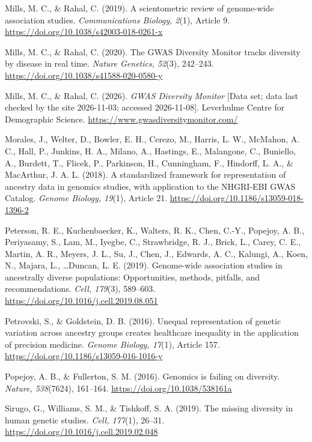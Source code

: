 \documentclass[12pt]{article}
\begin{document}
Mills, M. C., \& Rahal, C. (2019). A scientometric review of genome-wide association studies. \emph{Communications Biology, 2}(1), Article 9. \url{https://doi.org/10.1038/s42003-018-0261-x}

Mills, M. C., \& Rahal, C. (2020). The GWAS Diversity Monitor tracks diversity by disease in real time. \emph{Nature Genetics, 52}(3), 242--243. \url{https://doi.org/10.1038/s41588-020-0580-y}

Mills, M. C., \& Rahal, C. (2026). \emph{GWAS Diversity Monitor} [Data set; data last checked by the site 2026-11-03; accessed 2026-11-08]. Leverhulme Centre for Demographic Science. \url{https://www.gwasdiversitymonitor.com/}

Morales, J., Welter, D., Bowler, E. H., Cerezo, M., Harris, L. W., McMahon, A. C., Hall, P., Junkins, H. A., Milano, A., Hastings, E., Malangone, C., Buniello, A., Burdett, T., Flicek, P., Parkinson, H., Cunningham, F., Hindorff, L. A., \& MacArthur, J. A. L. (2018). A standardized framework for representation of ancestry data in genomics studies, with application to the NHGRI-EBI GWAS Catalog. \emph{Genome Biology, 19}(1), Article 21. \url{https://doi.org/10.1186/s13059-018-1396-2}

Peterson, R. E., Kuchenbaecker, K., Walters, R. K., Chen, C.-Y., Popejoy, A. B., Periyasamy, S., Lam, M., Iyegbe, C., Strawbridge, R. J., Brick, L., Carey, C. E., Martin, A. R., Meyers, J. L., Su, J., Chen, J., Edwards, A. C., Kalungi, A., Koen, N., Majara, L., \ldots Duncan, L. E. (2019). Genome-wide association studies in ancestrally diverse populations: Opportunities, methods, pitfalls, and recommendations. \emph{Cell, 179}(3), 589--603. \url{https://doi.org/10.1016/j.cell.2019.08.051}

Petrovski, S., \& Goldstein, D. B. (2016). Unequal representation of genetic variation across ancestry groups creates healthcare inequality in the application of precision medicine. \emph{Genome Biology, 17}(1), Article 157. \url{https://doi.org/10.1186/s13059-016-1016-y}

Popejoy, A. B., \& Fullerton, S. M. (2016). Genomics is failing on diversity. \emph{Nature, 538}(7624), 161--164. \url{https://doi.org/10.1038/538161a}

Sirugo, G., Williams, S. M., \& Tishkoff, S. A. (2019). The missing diversity in human genetic studies. \emph{Cell, 177}(1), 26--31. \url{https://doi.org/10.1016/j.cell.2019.02.048}
\endgroup
\end{document}
